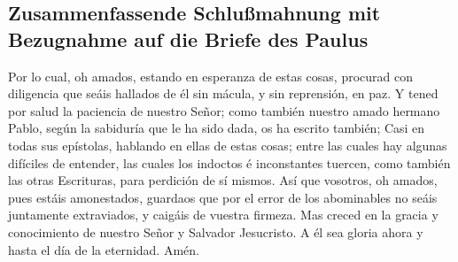 \hypertarget{zusammenfassende-schluuxdfmahnung-mit-bezugnahme-auf-die-briefe-des-paulus}{%
\subsection{Zusammenfassende Schlußmahnung mit Bezugnahme auf die Briefe
des
Paulus}\label{zusammenfassende-schluuxdfmahnung-mit-bezugnahme-auf-die-briefe-des-paulus}}

 Por lo cual, oh amados, estando en esperanza de estas
cosas, procurad con diligencia que seáis hallados de él sin mácula, y
sin reprensión, en paz.  Y tened por salud la paciencia de
nuestro Señor; como también nuestro amado hermano Pablo, según la
sabiduría que le ha sido dada, os ha escrito también;  Casi
en todas sus epístolas, hablando en ellas de estas cosas; entre las
cuales hay algunas difíciles de entender, las cuales los indoctos é
inconstantes tuercen, como también las otras Escrituras, para perdición
de sí mismos.  Así que vosotros, oh amados, pues estáis
amonestados, guardaos que por el error de los abominables no seáis
juntamente extraviados, y caigáis de vuestra firmeza.  Mas
creced en la gracia y conocimiento de nuestro Señor y Salvador
Jesucristo. A él sea gloria ahora y hasta el día de la eternidad. Amén.
